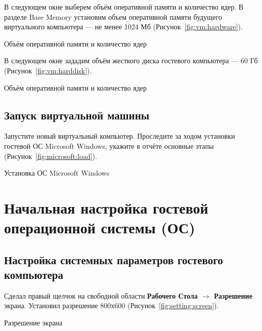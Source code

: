В следующем окне выберем объём оперативной памяти и количество ядер.
В разделе Base Memory установим объем оперативной памяти будущего
виртуального компьютера --- не менее 1024 Мб (Рисунок~\ref{fig:vm:hardware}).

\begin{image}
	\caption{Объём оперативной памяти и количество ядер}
	\label{fig:vm:hardware}
\end{image}

В следующем окне зададим объём жесткого диска гостевого компьютера --- 60 Гб
(Рисунок~\ref{fig:vm:harddisk}).

\begin{image}
	\caption{Объём оперативной памяти и количество ядер}
	\label{fig:vm:harddisk}
\end{image}

\subsection{Запуск виртуальной машины}

Запустите новый виртуальный компьютер.
Проследите за ходом установки гостевой ОС Microsoft Windows,
укажите в отчёте основные этапы (Рисунок~\ref{fig:microsoft:load}).

\begin{image}
	\caption{Установка ОС Microsoft Windows}
	\label{fig:microsoft:load}
\end{image}

\clearpage

\section{Начальная настройка гостевой операционной системы (ОС)}

\subsection{Настройка системных параметров гостевого компьютера}

Сделал правый щелчок на свободной области
\textbf{Рабочего Стола $\rightarrow$ Разрешение} экрана.
Установил разрешение 800х600 (Рисунок~\ref{fig:setting:screen}).

\begin{image}
	\caption{Разрешение экрана}
	\label{fig:setting:screen}
\end{image}

